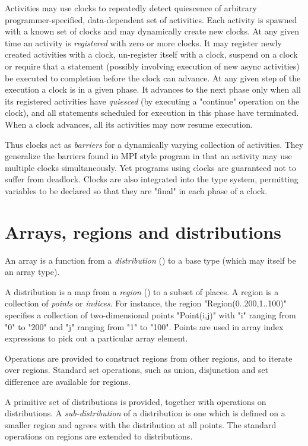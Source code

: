 Activities may use clocks to repeatedly detect quiescence of arbitrary
programmer-specified, data-dependent set of activities. Each activity
is spawned with a known set of clocks and may dynamically create new
clocks. At any given time an activity is \emph{registered} with zero or
more clocks. It may register newly created activities with a clock,
un-register itself with a clock, suspend on a clock or require that a
statement (possibly involving execution of new async activities) be
executed to completion before the clock can advance.  At any given
step of the execution a clock is in a given phase. It advances to the
next phase only when all its registered activities have \emph{quiesced}
(by executing a \xcd"continue" operation on the clock), and all
statements scheduled for execution in this phase have terminated.
When a clock advances, all its activities may now resume execution.

Thus clocks act as \emph{barriers} for a dynamically varying collection
of activities. They generalize the barriers found in MPI style program
in that an activity may use multiple clocks simultaneously. Yet
programs using clocks are guaranteed not to suffer from
deadlock. Clocks are also integrated into the \Xten{} type system,
permitting variables to be declared so that they are \xcd"final" in each
phase of a clock.

\section{Arrays, regions and distributions}

An \Xten{} array is a function from a \emph{distribution}
() to a base type (which may itself be an
array type).

A distribution is a map from a \emph{region} () to a
subset of places.  A region is a collection of \emph{points} or
\emph{indices}. For instance, the region \xcd"Region(0..200,1..100)" specifies
a collection of two-dimensional points \xcd"Point(i,j)" with 
\xcd"i" ranging from \xcd"0" to \xcd"200" and \xcd"j" ranging
from \xcd"1" to \xcd"100". Points are used in array index expressions
to pick out a particular array element.

Operations are provided to construct regions from other regions, and
to iterate over regions. Standard set operations, such as union,
disjunction and set difference are available for regions.

A primitive set of distributions is provided, together with operations
on distributions. A \emph{sub-distribution} of a distribution is one
which is defined on a smaller region and agrees with the distribution
at all points.  The standard operations on regions are extended to
distributions.


